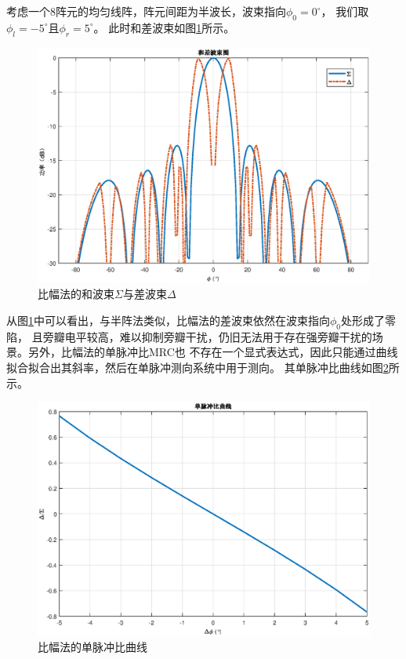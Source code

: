 \documentclass[master]{thesis-uestc}
\begin{document}
考虑一个$8$阵元的均匀线阵，阵元间距为半波长，波束指向$\phi_0=0^\circ$，
我们取$\phi_l=-5^\circ$且$\phi_r=5^\circ$。
此时和差波束如图\ref{ACM_sigma_delta}所示。
\begin{figure}[H]
    \includegraphics[scale=0.5]{pic/ACM_sigma_delta.eps}
    \caption{比幅法的和波束$\Sigma$与差波束$\Delta$}
    \label{ACM_sigma_delta}
\end{figure}

从图\ref{ACM_sigma_delta}中可以看出，与半阵法类似，比幅法的差波束依然在波束指向$\phi_0$处形成了零陷，
且旁瓣电平较高，难以抑制旁瓣干扰，仍旧无法用于存在强旁瓣干扰的场景。另外，比幅法的单脉冲比MRC也
不存在一个显式表达式，因此只能通过曲线拟合拟合出其斜率，然后在单脉冲测向系统中用于测向。
其单脉冲比曲线如图\ref{ACM_MRC_figure}所示。
\begin{figure}[H]
    \includegraphics[scale=0.5]{pic/ACM_MRC.eps}
    \caption{比幅法的单脉冲比曲线}
    \label{ACM_MRC_figure}
\end{figure}
\end{document}
